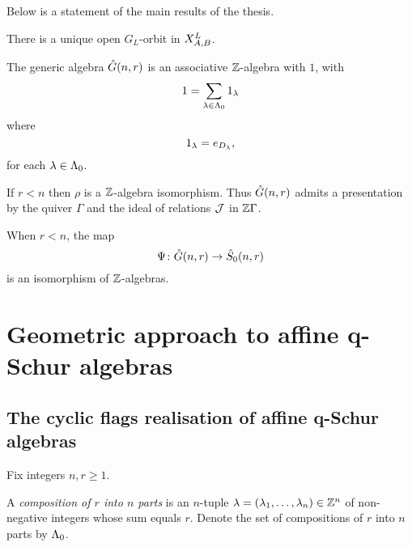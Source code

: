 \documentclass[a4paper, 11pt]{report}
\begin{document}
Below is a statement of the main results of the thesis.

\begin{proposition*}
There is a unique open $G_L$-orbit in $\xprod[L]{A,B}$.
\end{proposition*}

\begin{proposition*}
The generic algebra $\generic$ is an associative $\integers$-algebra with $1$, with
\begin{equation*}
1=\sum_{\lambda\in\compositions} 1_\lambda
\end{equation*}
where
\begin{equation*}
1_\lambda = e_{\diag{\lambda}},
\end{equation*}
for each $\lambda\in\compositions$.
\end{proposition*}

\begin{theorem*}
If $r<n$ then $\rho$ is a $\integers$-algebra isomorphism. Thus $\generic$ admits a presentation by the quiver $\Gamma$ and the ideal of relations $\zerorelations$ in $\integers\Gamma$.
\end{theorem*}

\begin{theorem*}
When $r<n$, the map
\begin{equation*}
\Psi\colon\generic\to\zeroschur
\end{equation*}
is an isomorphism of $\integers$-algebras.
\end{theorem*}


\chapter{Geometric approach to affine q-Schur algebras}


\section{The cyclic flags realisation of affine q-Schur algebras}

Fix integers $n,r\geq 1$.

\begin{definition}\label{def:compositions}
A \emph{composition of $r$ into $n$ parts} is an $n$-tuple $\lambda=(\lambda_1,\ldots,\lambda_n)\in\integers^n$ of non-negative integers whose sum equals $r$. Denote the set of compositions of $r$ into $n$ parts by $\compositions$.
\end{definition}
\end{document}
